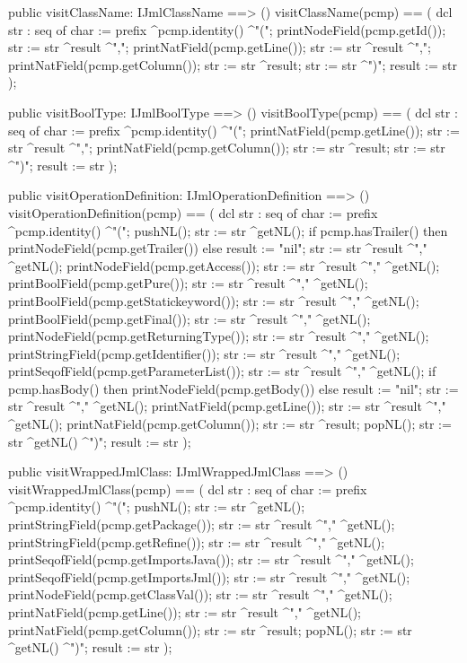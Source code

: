 \begin{vdm_al}
  public visitClassName: IJmlClassName ==> ()
  visitClassName(pcmp) ==
    ( dcl str : seq of char := prefix ^pcmp.identity() ^"(";
      printNodeField(pcmp.getId());
      str := str ^result ^",";
      printNatField(pcmp.getLine());
      str := str ^result ^",";
      printNatField(pcmp.getColumn());
      str := str ^result;
      str := str ^")";
      result := str );

  public visitBoolType: IJmlBoolType ==> ()
  visitBoolType(pcmp) ==
    ( dcl str : seq of char := prefix ^pcmp.identity() ^"(";
      printNatField(pcmp.getLine());
      str := str ^result ^",";
      printNatField(pcmp.getColumn());
      str := str ^result;
      str := str ^")";
      result := str );

  public visitOperationDefinition: IJmlOperationDefinition ==> ()
  visitOperationDefinition(pcmp) ==
    ( dcl str : seq of char := prefix ^pcmp.identity() ^"(";
      pushNL();
      str := str ^getNL();
      if pcmp.hasTrailer()
      then printNodeField(pcmp.getTrailer())
      else result := "nil";
      str := str ^result ^"," ^getNL();
      printNodeField(pcmp.getAccess());
      str := str ^result ^"," ^getNL();
      printBoolField(pcmp.getPure());
      str := str ^result ^"," ^getNL();
      printBoolField(pcmp.getStatickeyword());
      str := str ^result ^"," ^getNL();
      printBoolField(pcmp.getFinal());
      str := str ^result ^"," ^getNL();
      printNodeField(pcmp.getReturningType());
      str := str ^result ^"," ^getNL();
      printStringField(pcmp.getIdentifier());
      str := str ^result ^"," ^getNL();
      printSeqofField(pcmp.getParameterList());
      str := str ^result ^"," ^getNL();
      if pcmp.hasBody()
      then printNodeField(pcmp.getBody())
      else result := "nil";
      str := str ^result ^"," ^getNL();
      printNatField(pcmp.getLine());
      str := str ^result ^"," ^getNL();
      printNatField(pcmp.getColumn());
      str := str ^result;
      popNL();
      str := str ^getNL() ^")";
      result := str );

  public visitWrappedJmlClass: IJmlWrappedJmlClass ==> ()
  visitWrappedJmlClass(pcmp) ==
    ( dcl str : seq of char := prefix ^pcmp.identity() ^"(";
      pushNL();
      str := str ^getNL();
      printStringField(pcmp.getPackage());
      str := str ^result ^"," ^getNL();
      printStringField(pcmp.getRefine());
      str := str ^result ^"," ^getNL();
      printSeqofField(pcmp.getImportsJava());
      str := str ^result ^"," ^getNL();
      printSeqofField(pcmp.getImportsJml());
      str := str ^result ^"," ^getNL();
      printNodeField(pcmp.getClassVal());
      str := str ^result ^"," ^getNL();
      printNatField(pcmp.getLine());
      str := str ^result ^"," ^getNL();
      printNatField(pcmp.getColumn());
      str := str ^result;
      popNL();
      str := str ^getNL() ^")";
      result := str );


\end{vdm_al}
